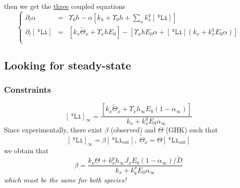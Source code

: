\documentclass[aps,onecolumn,12pt]{revtex4}
\newcommand{\mychem}[1]{\mathtt{#1}}
\newcommand{\myconc}[1]{\left\lbrack{#1}\right\rbrack}
\newcommand{\spLi}[1]{{~^{\mychem{#1}}\mychem{Li}}}
\newcommand{\Li}[1]{\myconc{\spLi{#1}}}
\newcommand{\spLiOut}[1]{{\spLi{#1}}_{\mathrm{out}}}
\newcommand{\LiOut}[1]{\myconc{\spLiOut{#1}}}
\newcommand{\spproton}{\mychem{H}}
\newcommand{\proton}{\myconc{\spproton}}
\begin{document}
%


then we get the \underline{three} coupled equations
\begin{equation}
\boxed{
\left\lbrace
	\begin{array}{rcl}
		\partial_t\alpha    & = & \Upsilon_0 h - \alpha\left\lbrack k_h+\Upsilon_0 h +{\sum_x k_x^q \Li{x}} \right\rbrack\\
		\partial_t\Li{x} & = & \left\lbrack k_x\tilde{\Theta}_x+\Upsilon_x h  E_0\right\rbrack
		-\left\lbrack
			\Upsilon_x h  E_0\alpha +  \Li{x}  \left(k_x + k_x^q E_0\alpha\right)
		\right\rbrack\\
	\end{array}
\right.
}
\end{equation}

\subsection{Looking for steady-state}
\subsubsection{Constraints}
\begin{equation}
	\Li{x}_\infty = \dfrac{\left\lbrack k_x\tilde{\Theta}_x+\Upsilon_x h_\infty E_0 \left(1-\alpha_\infty\right)\right\rbrack}{k_x+ k_x^q E_0\alpha_\infty}
\end{equation}
Since experimentally, there exist ${\beta}$ (observed) and $\Theta$ (GHK) such that
\begin{equation}
	\Li{x}_\infty=\beta\LiOut{x},\;\tilde{\Theta}_x = \Theta \LiOut{x}
\end{equation}
we obtain that
\begin{equation}
		\beta = \dfrac{k_x\Theta + k_x^p h_\infty {J_x} E_0 (1-\alpha_\infty)/\tilde{D}}{k_x+ k_q^x E_0\alpha_\infty}
\end{equation}
\textit{which must be the same for both species!}
\end{document}
